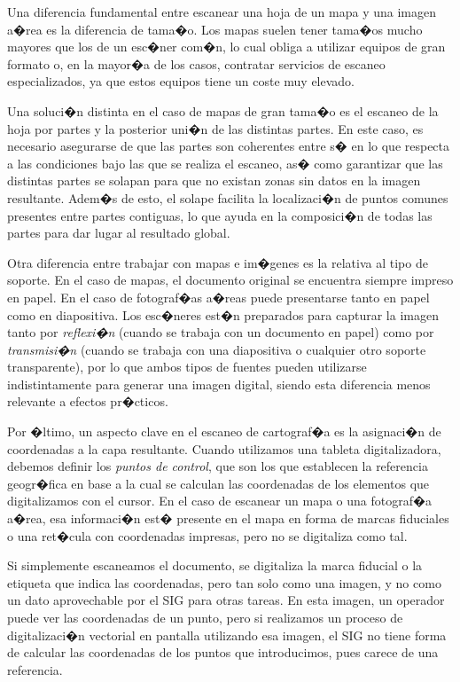 Una diferencia fundamental entre escanear una hoja de un mapa y una imagen a�rea es la diferencia de tama�o. Los mapas suelen tener tama�os mucho mayores que los de un esc�ner com�n, lo cual obliga a utilizar equipos de gran formato o, en la mayor�a de los casos, contratar servicios de escaneo especializados, ya que estos equipos tiene un coste muy elevado. 

Una soluci�n distinta en el caso de mapas de gran tama�o es el escaneo de la hoja por partes y la posterior uni�n de las distintas partes. En este caso, es necesario asegurarse de que las partes son coherentes entre s� en lo que respecta a las condiciones bajo las que se realiza el escaneo, as� como garantizar que las distintas partes se solapan para que no existan zonas sin datos en la imagen resultante. Adem�s de esto, el solape facilita la localizaci�n de puntos comunes presentes entre partes contiguas, lo que ayuda en la composici�n de todas las partes para dar lugar al resultado global.

Otra diferencia entre trabajar con mapas e im�genes es la relativa al tipo de soporte. En el caso de mapas, el documento original se encuentra siempre impreso en papel. En el caso de fotograf�as a�reas puede presentarse tanto en papel como en diapositiva. Los esc�neres est�n preparados para capturar la imagen tanto por \emph{reflexi�n} (cuando se trabaja con un documento en papel) como por \emph{transmisi�n} (cuando se trabaja con una diapositiva o cualquier otro soporte transparente), por lo que ambos tipos de fuentes pueden utilizarse indistintamente para generar una imagen digital, siendo esta diferencia menos relevante a efectos pr�cticos.

Por �ltimo, un aspecto clave en el escaneo de cartograf�a es la asignaci�n de coordenadas a la capa resultante. Cuando utilizamos una tableta digitalizadora, debemos definir los \emph{puntos de control}, que son los que establecen la referencia geogr�fica en base a la cual se calculan las coordenadas de los elementos que digitalizamos con el cursor. En el caso de escanear un mapa o una fotograf�a a�rea, esa informaci�n est� presente en el mapa en forma de marcas fiduciales o una ret�cula con coordenadas impresas, pero no se digitaliza como tal.

Si simplemente escaneamos el documento, se digitaliza la marca fiducial o la etiqueta que indica las coordenadas, pero tan solo como una imagen, y no como un dato aprovechable por el SIG para otras tareas. En esta imagen, un operador puede ver las coordenadas de un punto, pero si realizamos un proceso de digitalizaci�n vectorial en pantalla utilizando esa imagen, el SIG no tiene forma de calcular las coordenadas de los puntos que introducimos, pues carece de una referencia.

